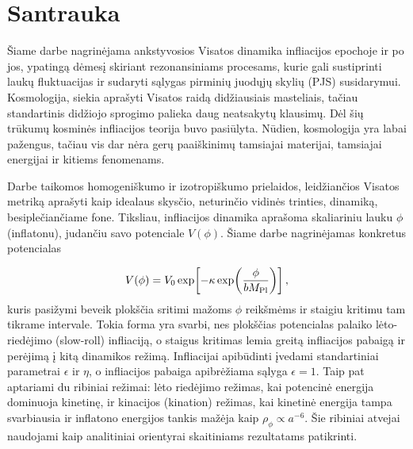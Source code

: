 
\section*{Santrauka}

Šiame darbe nagrinėjama ankstyvosios Visatos dinamika infliacijos epochoje ir po jos, ypatingą dėmesį skiriant rezonansiniams procesams, kurie gali sustiprinti laukų fluktuacijas ir sudaryti sąlygas pirminių juodųjų skylių (PJS) susidarymui. Kosmologija, siekia aprašyti Visatos raidą didžiausiais masteliais, tačiau standartinis didžiojo sprogimo palieka daug neatsakytų klausimų. Dėl šių trūkumų kosminės infliacijos teorija buvo pasiūlyta. Nūdien, kosmologija yra labai pažengus, tačiau vis dar nėra gerų paaiškinimų tamsiajai materijai, tamsiajai energijai ir kitiems fenomenams.

Darbe taikomos homogeniškumo ir izotropiškumo prielaidos, leidžiančios Visatos metriką aprašyti kaip idealaus skysčio, neturinčio vidinės trinties, dinamiką, besiplečiančiame fone. Tiksliau, infliacijos dinamika aprašoma skaliariniu lauku $\phi$ (inflatonu), judančiu savo potenciale $V(\phi)$. Šiame darbe nagrinėjamas konkretus potencialas

\begin{equation*}
V(\phi)=V_0\exp\!\left[-\kappa\exp\!\left(\frac{\phi}{bM_{\rm Pl}}\right)\right],
\end{equation*}
kuris pasižymi beveik plokščia sritimi mažoms $\phi$ reikšmėms ir staigiu kritimu tam tikrame intervale. Tokia forma yra svarbi, nes plokščias potencialas palaiko lėto-riedėjimo (slow-roll) infliaciją, o staigus kritimas lemia greitą infliacijos pabaigą ir perėjimą į kitą dinamikos režimą. Infliacijai apibūdinti įvedami standartiniai parametrai $\epsilon$ ir $\eta$, o infliacijos pabaiga apibrėžiama sąlyga $\epsilon=1$. Taip pat aptariami du ribiniai režimai: lėto riedėjimo režimas, kai potencinė energija dominuoja kinetinę, ir kinacijos (kination) režimas, kai kinetinė energija tampa svarbiausia ir inflatono energijos tankis mažėja kaip $\rho_\phi \propto a^{-6}$. Šie ribiniai atvejai naudojami kaip analitiniai orientyrai skaitiniams rezultatams patikrinti.

